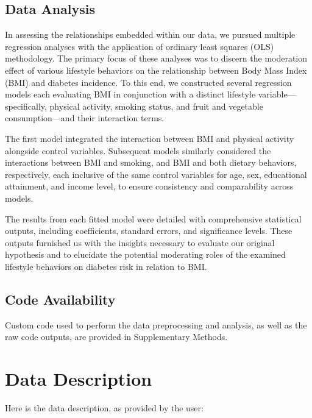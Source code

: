 \documentclass[11pt]{article}
\begin{document}
\subsection*{Data Analysis}
In assessing the relationships embedded within our data, we pursued multiple regression analyses with the application of ordinary least squares (OLS) methodology. The primary focus of these analyses was to discern the moderation effect of various lifestyle behaviors on the relationship between Body Mass Index (BMI) and diabetes incidence. To this end, we constructed several regression models each evaluating BMI in conjunction with a distinct lifestyle variable—specifically, physical activity, smoking status, and fruit and vegetable consumption—and their interaction terms.

The first model integrated the interaction between BMI and physical activity alongside control variables. Subsequent models similarly considered the interactions between BMI and smoking, and BMI and both dietary behaviors, respectively, each inclusive of the same control variables for age, sex, educational attainment, and income level, to ensure consistency and comparability across models.

The results from each fitted model were detailed with comprehensive statistical outputs, including coefficients, standard errors, and significance levels. These outputs furnished us with the insights necessary to evaluate our original hypothesis and to elucidate the potential moderating roles of the examined lifestyle behaviors on diabetes risk in relation to BMI.\subsection*{Code Availability}

Custom code used to perform the data preprocessing and analysis, as well as the raw code outputs, are provided in Supplementary Methods.






\clearpage
\appendix

\section{Data Description} \label{sec:data_description} Here is the data description, as provided by the user:
\end{document}
